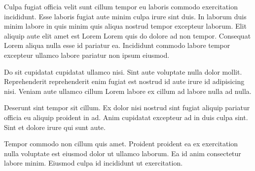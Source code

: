 Culpa fugiat officia velit sunt cillum tempor eu laboris commodo exercitation incididunt. Esse laboris fugiat aute minim culpa irure sint duis. In laborum duis minim labore in quis minim quis aliqua nostrud tempor excepteur laborum. Elit aliquip aute elit amet est Lorem Lorem quis do dolore ad non tempor. Consequat Lorem aliqua nulla esse id pariatur ea. Incididunt commodo labore tempor excepteur ullamco labore pariatur non ipsum eiusmod.

Do sit cupidatat cupidatat ullamco nisi. Sint aute voluptate nulla dolor mollit. Reprehenderit reprehenderit enim fugiat est nostrud id aute irure id adipisicing nisi. Veniam aute ullamco cillum Lorem labore ex cillum ad labore nulla ad nulla.

Deserunt sint tempor sit cillum. Ex dolor nisi nostrud sint fugiat aliquip pariatur officia eu aliquip proident in ad. Anim cupidatat excepteur ad in duis culpa sint. Sint et dolore irure qui sunt aute.

Tempor commodo non cillum quis amet. Proident proident ea ex exercitation nulla voluptate est eiusmod dolor ut ullamco laborum. Ea id anim consectetur labore minim. Eiusmod culpa id incididunt ut exercitation.